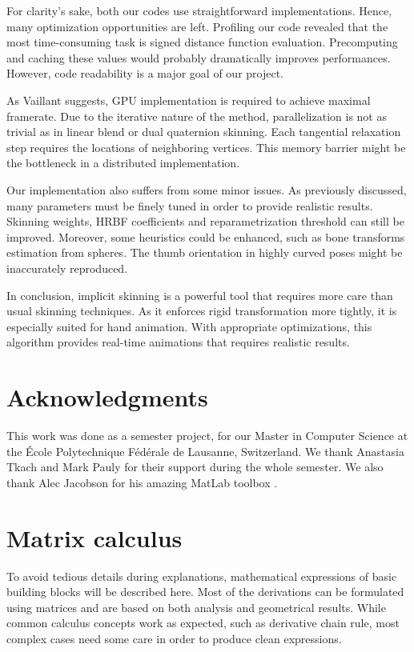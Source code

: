 \documentclass[a4paper,10pt]{article}
\begin{document}
\begin{multicols}{2}
For clarity's sake, both our codes use straightforward implementations.
Hence, many optimization opportunities are left.
Profiling our code revealed that the most time-consuming task is signed distance function evaluation.
Precomputing and caching these values would probably dramatically improves performances.
However, code readability is a major goal of our project.

As Vaillant suggests, GPU implementation is required to achieve maximal framerate.
Due to the iterative nature of the method, parallelization is not as trivial as in linear blend or dual quaternion skinning.
Each tangential relaxation step requires the locations of neighboring vertices.
This memory barrier might be the bottleneck in a distributed implementation.

Our implementation also suffers from some minor issues.
As previously discussed, many parameters must be finely tuned in order to provide realistic results.
Skinning weights, HRBF coefficients and reparametrization threshold can still be improved.
Moreover, some heuristics could be enhanced, such as bone transforms estimation from spheres.
The thumb orientation in highly curved poses might be inaccurately reproduced.

In conclusion, implicit skinning is a powerful tool that requires more care than usual skinning techniques.
As it enforces rigid transformation more tightly, it is especially suited for hand animation.
With appropriate optimizations, this algorithm provides real-time animations that requires realistic results.


\section*{Acknowledgments}

This work was done as a semester project, for our Master in Computer Science at the École Polytechnique Fédérale de Lausanne, Switzerland.
We thank Anastasia Tkach and Mark Pauly for their support during the whole semester.
We also thank Alec Jacobson for his amazing MatLab toolbox \cite{gptoolbox}.


\appendix

\section{Matrix calculus}
\label{section:calculus}

To avoid tedious details during explanations, mathematical expressions of basic building blocks will be described here.
Most of the derivations can be formulated using matrices and are based on both analysis and geometrical results.
While common calculus concepts work as expected, such as derivative chain rule, most complex cases need some care in order to produce clean expressions.


\end{multicols}
\end{document}
